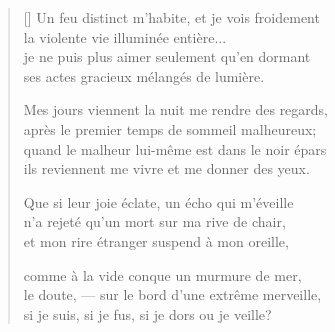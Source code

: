 {\itshape
\begin{verse}[\versewidth]
  Un feu distinct m'habite, et je vois froidement \\
  la violente vie illuminée entière... \\
  je ne puis plus aimer seulement qu'en dormant \\
  ses actes gracieux mélangés de lumière.

  Mes jours viennent la nuit me rendre des regards, \\
  après le premier temps de sommeil malheureux; \\
  quand le malheur lui-même est dans le noir épars \\
  ils reviennent me vivre et me donner des yeux.

  Que si leur joie éclate, un écho qui m'éveille \\
  n'a rejeté qu'un mort sur ma rive de chair, \\
  et mon rire étranger suspend à mon oreille,

  comme à la vide conque un murmure de mer, \\
  le doute, --- sur le bord d'une extrême merveille, \\
  si je suis, si je fus, si je dors ou je veille?
\end{verse}
}
